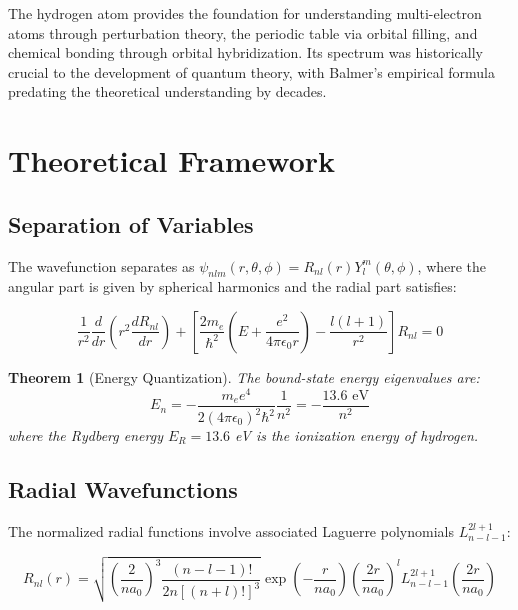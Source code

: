 \documentclass[11pt,a4paper]{article}
\newtheorem{theorem}{Theorem}[section]
\begin{document}
The hydrogen atom provides the foundation for understanding multi-electron atoms through perturbation theory, the periodic table via orbital filling, and chemical bonding through orbital hybridization. Its spectrum was historically crucial to the development of quantum theory, with Balmer's empirical formula predating the theoretical understanding by decades.

\section{Theoretical Framework}

\subsection{Separation of Variables}

The wavefunction separates as $\psi_{nlm}(r,\theta,\phi) = R_{nl}(r)Y_l^m(\theta,\phi)$, where the angular part is given by spherical harmonics and the radial part satisfies:

\begin{equation}
\frac{1}{r^2}\frac{d}{dr}\left(r^2\frac{dR_{nl}}{dr}\right) + \left[\frac{2m_e}{\hbar^2}\left(E + \frac{e^2}{4\pi\epsilon_0 r}\right) - \frac{l(l+1)}{r^2}\right]R_{nl} = 0
\end{equation}

\begin{theorem}[Energy Quantization]
The bound-state energy eigenvalues are:
\begin{equation}
E_n = -\frac{m_e e^4}{2(4\pi\epsilon_0)^2\hbar^2}\frac{1}{n^2} = -\frac{13.6\text{ eV}}{n^2}
\end{equation}
where the Rydberg energy $E_R = 13.6$ eV is the ionization energy of hydrogen.
\end{theorem}

\subsection{Radial Wavefunctions}

The normalized radial functions involve associated Laguerre polynomials $L_{n-l-1}^{2l+1}$:

\begin{equation}
R_{nl}(r) = \sqrt{\left(\frac{2}{na_0}\right)^3\frac{(n-l-1)!}{2n[(n+l)!]^3}}\exp\left(-\frac{r}{na_0}\right)\left(\frac{2r}{na_0}\right)^l L_{n-l-1}^{2l+1}\left(\frac{2r}{na_0}\right)
\end{equation}
\end{document}
